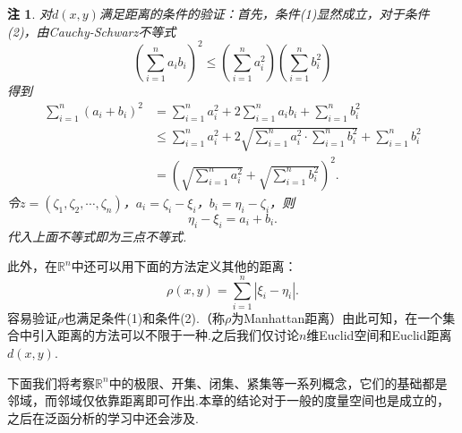 \documentclass[lang=cn,12pt]{ctexart}
\theoremstyle{definition}
\theoremstyle{plain}
\newtheorem*{remark}{注}
\begin{document}
\begin{remark}
	对$d(x,y)$满足距离的条件的验证：首先，条件(1)显然成立，对于条件(2)，由Cauchy-Schwarz不等式
	$$\left(\sum_{i=1}^{n}a_ib_i\right)^2\leqslant\left(\sum_{i=1}^{n}a_i^2\right)\left(\sum_{i=1}^{n}b_i^2\right)$$
	得到
	\begin{align*}
		\sum_{i=1}^{n}(a_i+b_i)^2
		&=\sum_{i=1}^{n}a_i^2+2\sum_{i=1}^{n}a_ib_i+\sum_{i=1}^{n}b_i^2\\
		&\leqslant\sum_{i=1}^{n}a_i^2+2\sqrt{\sum_{i=1}^{n}a_i^2\cdot\sum_{i=1}^{n}b_i^2}+\sum_{i=1}^{n}b_i^2\\
		&=\left(\sqrt{\sum_{i=1}^{n}a_i^2}+\sqrt{\sum_{i=1}^{n}b_i^2}\right)^2.
	\end{align*}
	令$z=(\zeta_1,\zeta_2,\cdots,\zeta_n)$，$a_i=\zeta_i-\xi_i$，$b_i=\eta_i-\zeta_i$，则
	$$\eta_i-\xi_i=a_i+b_i.$$
	代入上面不等式即为三点不等式.
\end{remark}

此外，在$\mathbb{R}^n$中还可以用下面的方法定义其他的距离：
$$\rho(x,y)=\sum_{i=1}^{n}|\xi_i-\eta_i|.$$
容易验证$\rho$也满足条件(1)和条件(2).（称$\rho$为Manhattan距离）由此可知，在一个集合中引入距离的方法可以不限于一种.之后我们仅讨论$n$维Euclid空间和Euclid距离$d(x,y)$.

下面我们将考察$\mathbb{R}^n$中的极限、开集、闭集、紧集等一系列概念，它们的基础都是邻域，而邻域仅依靠距离即可作出.本章的结论对于一般的度量空间也是成立的，之后在泛函分析的学习中还会涉及.
\end{document}
